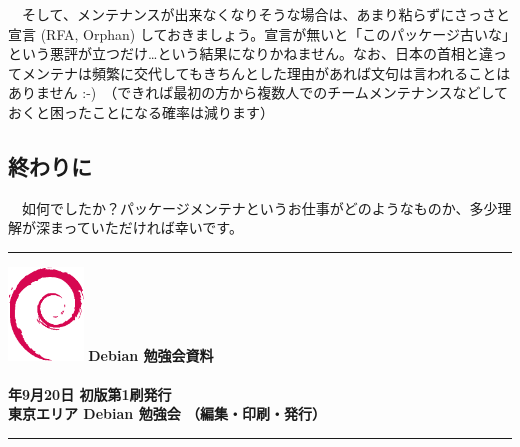 \documentclass[mingoth,a4paper]{jsarticle}
\newcommand{\debmtgyear}{2008}
\newcommand{\debmtgmonth}{9}
\newcommand{\debmtgdate}{20}
\begin{document}
　そして、メンテナンスが出来なくなりそうな場合は、あまり粘らずにさっさと宣言 (RFA, Orphan) しておきましょう。宣言が無いと「このパッケージ古いな」という悪評が立つだけ…という結果になりかねません。なお、日本の首相と違ってメンテナは頻繁に交代してもきちんとした理由があれば文句は言われることはありません :-)　（できれば最初の方から複数人でのチームメンテナンスなどしておくと困ったことになる確率は減ります）


\subsection{終わりに}
　如何でしたか？パッケージメンテナというお仕事がどのようなものか、多少理解が深まっていただければ幸いです。


\clearpage






\cleartooddpage

\vspace*{15cm}
\hrule
\vspace{2mm}
\includegraphics[width=2cm]{image200502/openlogo-nd.eps}
\noindent \Large \bf Debian 勉強会資料\\ \\
\noindent \normalfont \debmtgyear{}年\debmtgmonth{}月\debmtgdate{}日 \hspace{5mm}  初版第1刷発行\\
\noindent \normalfont 東京エリア Debian 勉強会 （編集・印刷・発行）\\
\hrule
\end{document}
